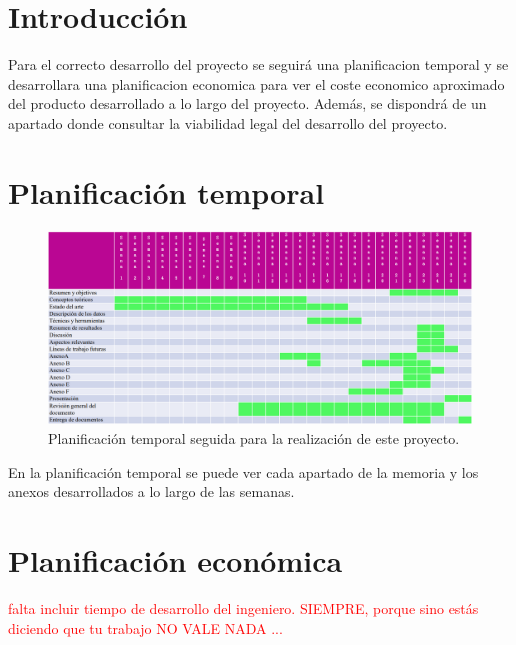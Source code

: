 
\section{Introducción}
Para el correcto desarrollo del proyecto se seguirá una planificacion temporal y se desarrollara una planificacion economica para ver el coste economico aproximado del producto desarrollado a lo largo del proyecto. Además, se dispondrá de un apartado donde consultar la viabilidad legal del desarrollo del proyecto.

\section{Planificación temporal}
\begin{figure}[h]
    \centering
    \includegraphics[width=1\textwidth]{img/PlanificacionTemporal.png}
    \caption{Planificación temporal seguida para la realización de este proyecto.}
    \label{fig:planTemporal} %
\end{figure}

En la planificación temporal se puede ver cada apartado de la memoria y los anexos desarrollados a lo largo de las semanas. 

\section{Planificación económica}
\textcolor{red}{falta incluir tiempo de desarrollo del ingeniero. SIEMPRE, porque sino estás diciendo que tu trabajo NO VALE NADA ...}

